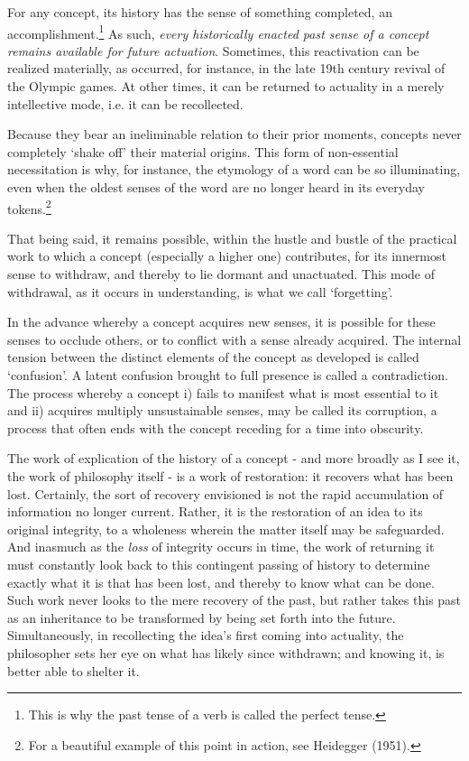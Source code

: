 \documentclass[]{article}
\begin{document}
For any concept, its history has the sense of something completed, an accomplishment.\footnote{This is why the past tense of a verb is called the perfect tense.} As such, \textit{every historically enacted past sense of a concept remains available for future actuation}. Sometimes, this reactivation can be realized materially, as occurred, for instance, in the late 19th century revival of the Olympic games. At other times, it can be returned to actuality in a merely intellective mode, i.e. it can be recollected. 

Because they bear an ineliminable relation to their prior moments, concepts never completely `shake off' their material origins. This form of non-essential necessitation is why, for instance, the etymology of a word can be so illuminating, even when the oldest senses of the word are no longer heard in its everyday tokens.\footnote{For a beautiful example of this point in action, see Heidegger (1951).}

That being said, it remains possible, within the hustle and bustle of the practical work to which a concept (especially a higher one) contributes, for its innermost sense to withdraw, and thereby to lie dormant and unactuated. This mode of withdrawal, as it occurs in understanding, is what we call `forgetting'.

In the advance whereby a concept acquires new senses, it is possible for these senses to occlude others, or to conflict with a sense already acquired. The internal tension between the distinct elements of the concept as developed is called `confusion'. A latent confusion brought to full presence is called a contradiction. The process whereby a concept i) fails to manifest what is most essential to it and ii) acquires multiply unsustainable senses, may be called its corruption, a process that often ends with the concept receding for a time into obscurity. 

The work of explication of the history of a concept - and more broadly as I see it, the work of philosophy itself - is a work of restoration: it recovers what has been lost. Certainly, the sort of recovery envisioned is not the rapid accumulation of information no longer current. Rather, it is the restoration of an idea to its original integrity, to a wholeness wherein the matter itself may be safeguarded. And inasmuch as the \textit{loss} of integrity occurs in time, the work of returning it must constantly look back to this contingent passing of history to determine exactly what it is that has been lost, and thereby to know what can be done. Such work never looks to the mere recovery of the past, but rather takes this past as an inheritance to be transformed by being set forth into the future. Simultaneously, in recollecting the idea's first coming into actuality, the philosopher sets her eye on what has likely since withdrawn; and knowing it, is better able to shelter it. 
\end{document}
